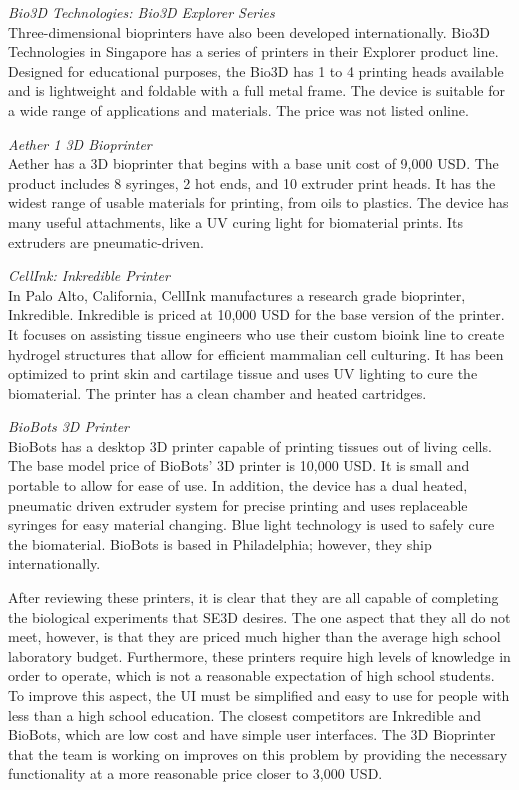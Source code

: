 \textit{Bio3D Technologies: Bio3D Explorer Series}\\
Three-dimensional bioprinters have also been developed internationally. Bio3D Technologies in Singapore has a series of printers in their Explorer product line. Designed for educational purposes, the Bio3D has 1 to 4 printing heads available and is lightweight and foldable with a full metal frame. The device is suitable for a wide range of applications and materials. The price was not listed online.

\textit{Aether 1 3D Bioprinter} \\
Aether has a 3D bioprinter that begins with a base unit cost of 9,000 USD. The product includes 8 syringes, 2 hot ends, and 10 extruder print heads. It has the widest range of usable materials for printing, from oils to plastics. The device has many useful attachments, like a UV curing light for biomaterial prints. Its extruders are pneumatic-driven.

\textit{CellInk: Inkredible Printer} \\
In Palo Alto, California, CellInk manufactures a research grade bioprinter, Inkredible. Inkredible is priced at 10,000 USD for the base version of the printer. It focuses on assisting tissue engineers who use their custom bioink line to create hydrogel structures that allow for efficient mammalian cell culturing. It has been optimized to print skin and cartilage tissue and uses UV lighting to cure the biomaterial. The printer has a clean chamber and heated cartridges.

\textit{BioBots 3D Printer} \\
BioBots has a desktop 3D printer capable of printing tissues out of living cells. The base model price of BioBots’ 3D printer is 10,000 USD. It is small and portable to allow for ease of use. In addition, the device has a dual heated, pneumatic driven extruder system for precise printing and uses replaceable syringes for easy material changing. Blue light technology is used to safely cure the biomaterial. BioBots is based in Philadelphia; however, they ship internationally.

After reviewing these printers, it is clear that they are all capable of completing the biological experiments that SE3D desires. The one aspect that they all do not meet, however, is that they are priced much higher than the average high school laboratory budget. Furthermore, these printers require high levels of knowledge in order to operate, which is not a reasonable expectation of high school students. To improve this aspect, the UI must be simplified and easy to use for people with less than a high school education. The closest competitors are Inkredible and BioBots, which are low cost and have simple user interfaces. The 3D Bioprinter that the team is working on improves on this problem by providing the necessary functionality at a more reasonable price closer to 3,000 USD. 

